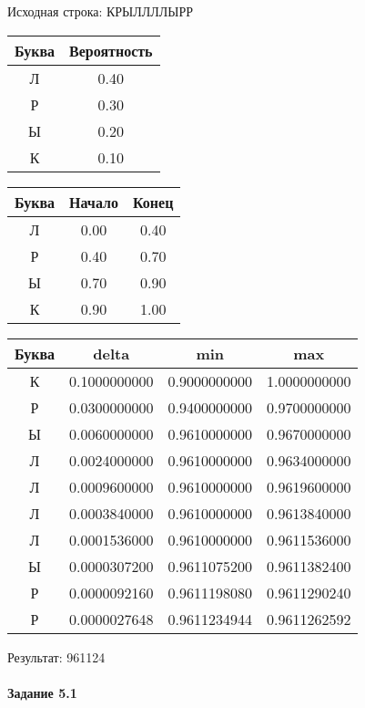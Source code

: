 \documentclass[a4paper, 12pt]{article}
\begin{document}
Исходная строка: КРЫЛЛЛЛЫРР\
\begin{center}
 \begin{tabular}{ |c|c| } 
  \hline
     Буква & Вероятность \\ \hline
Л & 0.40\\\hline
Р & 0.30\\\hline
Ы & 0.20\\\hline
К & 0.10
\\ \hline \end{tabular}
\end{center}
\begin{center}
 \begin{tabular}{ |c|c|c| } 
  \hline
     Буква & Начало & Конец \\ \hline
Л & 0.00 & 0.40\\\hline
Р & 0.40 & 0.70\\\hline
Ы & 0.70 & 0.90\\\hline
К & 0.90 & 1.00
\\ \hline \end{tabular}
\end{center}
\begin{center}
 \begin{tabular}{ |c|c|c|c| } 
  \hline
     Буква & delta & min & max \\ \hline
К & 0.1000000000 & 0.9000000000 & 1.0000000000\\\hline
Р & 0.0300000000 & 0.9400000000 & 0.9700000000\\\hline
Ы & 0.0060000000 & 0.9610000000 & 0.9670000000\\\hline
Л & 0.0024000000 & 0.9610000000 & 0.9634000000\\\hline
Л & 0.0009600000 & 0.9610000000 & 0.9619600000\\\hline
Л & 0.0003840000 & 0.9610000000 & 0.9613840000\\\hline
Л & 0.0001536000 & 0.9610000000 & 0.9611536000\\\hline
Ы & 0.0000307200 & 0.9611075200 & 0.9611382400\\\hline
Р & 0.0000092160 & 0.9611198080 & 0.9611290240\\\hline
Р & 0.0000027648 & 0.9611234944 & 0.9611262592
\\ \hline \end{tabular}
\end{center}
Результат: 961124
\pagebreak
\paragraph{Задание 5.1}
\end{document}
